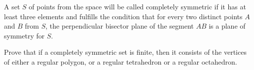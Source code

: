 A set $ S$ of points from the space will be called completely symmetric if it has at least three elements and fulfills the condition that for every two distinct points $ A$ and $ B$ from $ S$,  the perpendicular bisector plane of the segment $ AB$ is a plane of symmetry for $ S$.

 Prove that if a completely symmetric set is finite, then it consists of
 the vertices of either a regular polygon, or a regular tetrahedron or a
 regular octahedron.
